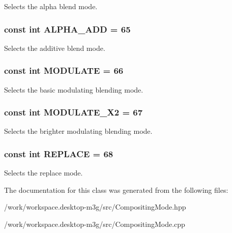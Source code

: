 Selects the alpha blend mode. \hypertarget{classm3g_1_1CompositingMode_91ac80a5450e5f7f7e382860829030d9}{
\subsubsection[{ALPHA\_\-ADD}]{\setlength{\rightskip}{0pt plus 5cm}const int {\bf ALPHA\_\-ADD} = 65}}
\label{classm3g_1_1CompositingMode_91ac80a5450e5f7f7e382860829030d9}


Selects the additive blend mode. \hypertarget{classm3g_1_1CompositingMode_96b64c2847348fb73a90c4a501cda9d1}{
\subsubsection[{MODULATE}]{\setlength{\rightskip}{0pt plus 5cm}const int {\bf MODULATE} = 66}}
\label{classm3g_1_1CompositingMode_96b64c2847348fb73a90c4a501cda9d1}


Selects the basic modulating blending mode. \hypertarget{classm3g_1_1CompositingMode_cb426684e42a5ae425989c65fbb7dbc4}{
\subsubsection[{MODULATE\_\-X2}]{\setlength{\rightskip}{0pt plus 5cm}const int {\bf MODULATE\_\-X2} = 67}}
\label{classm3g_1_1CompositingMode_cb426684e42a5ae425989c65fbb7dbc4}


Selects the brighter modulating blending mode. \hypertarget{classm3g_1_1CompositingMode_47a00ac5a59817a48db06fb2a538883c}{
\subsubsection[{REPLACE}]{\setlength{\rightskip}{0pt plus 5cm}const int {\bf REPLACE} = 68}}
\label{classm3g_1_1CompositingMode_47a00ac5a59817a48db06fb2a538883c}


Selects the replace mode. 

The documentation for this class was generated from the following files:\begin{CompactItemize}
\item 
/work/workspace.desktop-m3g/src/CompositingMode.hpp\item 
/work/workspace.desktop-m3g/src/CompositingMode.cpp\end{CompactItemize}
